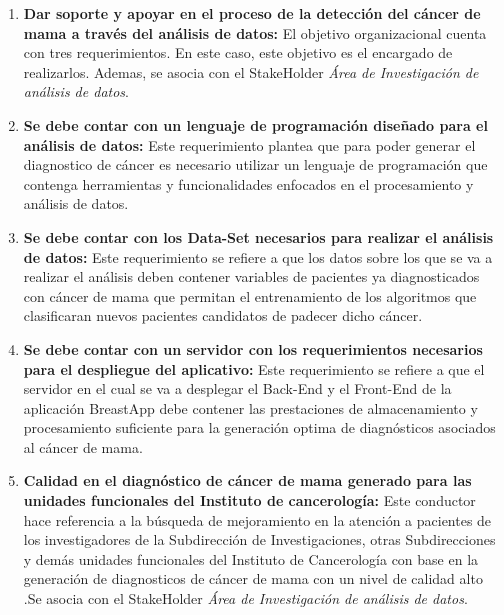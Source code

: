 \begin{enumerate}[label=\textbf{\arabic*})]
	\item  \textbf{Dar soporte y apoyar en el proceso de la detección del cáncer de mama a través del análisis de datos:} El objetivo organizacional cuenta con tres requerimientos. En este caso, este objetivo es el encargado de realizarlos. Ademas, se asocia con el StakeHolder \textit{Área de Investigación de  análisis de datos}.
	
	\item  \textbf{Se debe contar con un lenguaje de programación diseñado para el análisis de datos:} Este requerimiento plantea que para poder generar el diagnostico de cáncer es necesario utilizar un lenguaje de programación que contenga herramientas y funcionalidades enfocados en el procesamiento y análisis de datos.
	
	\item  \textbf{Se debe contar con los Data-Set necesarios para realizar el análisis de datos:} Este requerimiento se refiere a que los datos sobre los que se va a realizar el análisis deben contener variables de pacientes ya diagnosticados con cáncer de mama que permitan el entrenamiento de los algoritmos que clasificaran nuevos pacientes  candidatos de padecer dicho cáncer.
	
	\item  \textbf{Se debe contar con un servidor con los requerimientos necesarios para el despliegue del aplicativo:} Este requerimiento se refiere a que el servidor en el cual se va a desplegar el Back-End y el Front-End de la aplicación BreastApp debe contener las prestaciones de almacenamiento y procesamiento suficiente para la generación  optima de diagnósticos asociados al cáncer de mama.

	\item  \textbf{Calidad  en el diagnóstico de cáncer de mama generado para las unidades funcionales del Instituto de cancerología:} Este conductor hace referencia a la búsqueda de mejoramiento en la atención a pacientes de los investigadores de la Subdirección de Investigaciones, otras Subdirecciones y demás unidades funcionales del Instituto de Cancerología con base en la generación de diagnosticos de cáncer de mama con un nivel de calidad alto .Se asocia con el StakeHolder \textit{Área de Investigación de análisis de datos}.	
\end{enumerate}


